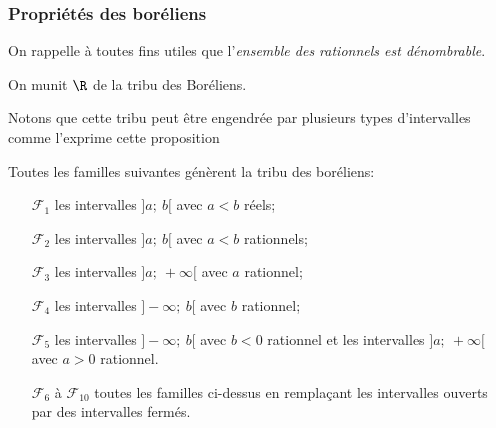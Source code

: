 \subsubsection{Propriétés des boréliens}

On rappelle à toutes fins utiles que l'\emph{ensemble des rationnels est dénombrable}.

On munit $\R$ de la tribu des Boréliens.

Notons que cette tribu peut être engendrée par plusieurs types d'intervalles comme l'exprime cette proposition
\begin{prop}
Toutes les familles suivantes génèrent la tribu des boréliens:
\begin{itemize}
\item[$\mathcal{F}_1$] les intervalles $]a;~b[$ avec $a<b$ réels;
\item[$\mathcal{F}_2$] les intervalles $]a;~b[$ avec $a<b$ rationnels;
\item[$\mathcal{F}_3$] les intervalles $]a;~+\infty[$ avec $a$ rationnel;
\item[$\mathcal{F}_4$] les intervalles $]-\infty;~b[$ avec $b$ rationnel;
\item[$\mathcal{F}_5$] les intervalles $]-\infty;~b[$ avec $b<0$ rationnel et les intervalles $]a;~+\infty[$ avec $a>0$ rationnel.
\item[$\mathcal{F}_6$ à $\mathcal{F}_{10}$] toutes les familles ci-dessus en remplaçant les intervalles ouverts par des intervalles fermés.
\end{itemize}
\end{prop}

